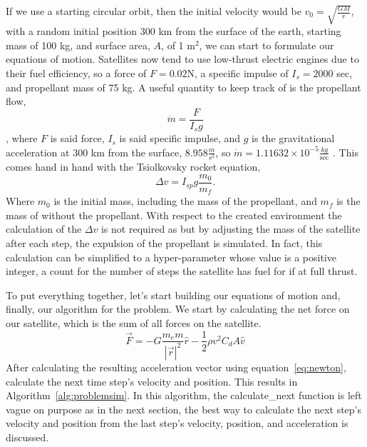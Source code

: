 If we use a starting circular orbit, then the initial velocity would be $v_0=\sqrt{\frac{GM}{r}}$, with a random initial position 300 km from the surface of the earth, starting mass of 100 kg, and surface area, $A$, of 1 $\text{m}^2$, we can start to formulate our equations of motion. Satellites now tend to use low-thrust electric engines due to their fuel efficiency, so a force of $F=0.02$N, a specific impulse of $I_s=2000$ sec, and propellant mass of 75 kg. A useful quantity to keep track of is the propellant flow, 
\begin{equation}
\dot{m}=\frac{F}{I_sg}
\end{equation}
, where $F$ is said force, $I_s$ is said specific impulse, and $g$ is the gravitational acceleration at 300 km from the surface, $8.958\frac{m}{s^2}$, so $\dot{m}=1.11632\times 10^{-5}\frac{kg}{\text{sec}}$ \cite{sutton_biblarz_2017}. This comes hand in hand with the Tsiolkovsky rocket equation, $$\Delta v=I_{sp}g\frac{m_0}{m_f}.$$ Where $m_0$ is the initial mass, including the mass of the propellant, and $m_f$ is the mass of without the propellant. With respect to the created environment the calculation of the $\Delta v$ is not required as but by adjusting the mass of the satellite after each step, the expulsion of the propellant is simulated. In fact, this calculation can be simplified to a hyper-parameter whose value is a positive integer, a count for the number of steps the satellite has fuel for if at full thrust.

To put everything together, let's start building our equations of motion and, finally, our algorithm for the problem. We start by calculating the net force on our satellite, which is the sum of all forces on the satellite. 
\begin{equation}\label{eq:force}
\vec{F}=-G\frac{m_e m}{|\vec{r}|^2}\hat{r}-\frac{1}{2}\rho v^2 C_d A\hat{v}
\end{equation}
After calculating the resulting acceleration vector using equation~\ref{eq:newton}, calculate the next time step's velocity and position. This results in Algorithm~\ref{alg:problemsim}. In this algorithm, the calculate\_next function is left vague on purpose as in the next section, the best way to calculate the next step's velocity and position from the last step's velocity, position, and acceleration is discussed.

